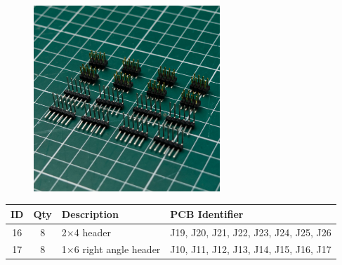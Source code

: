 \documentclass[12pt, a4paper]{article}
\newcommand{\drawrect}[2]{
    \draw[black, line width=2pt, rounded corners=3] (#1) rectangle (#2);
    \draw[white, line width=1pt, rounded corners=3] (#1) rectangle (#2);
}
\newcommand{\drawtext}[2]{
    \node[white] at (#1) {\contourlength{.075em}\contour{black}{#2}};
}
\begin{document}
\begin{figure}[H]
    \centering
    \hspace{2mm}
    \includegraphics[width=7cm]{images/headers_side.jpg}
\end{figure}

\begin{center}
    \small
    \setlength\extrarowheight{3pt}
    \begin{tabularx}{\textwidth}{|c|c|X|l|}
        \hline \rowcolor{lightgray} ID & Qty & Description & PCB Identifier\\
        \hline 16 & 8 & 2×4 header & J19, J20, J21, J22, J23, J24, J25, J26\\
        \hline 17 & 8 & 1×6 right angle header & J10, J11, J12, J13, J14, J15, J16, J17\\
        \hline
    \end{tabularx}
\end{center}
\end{document}
